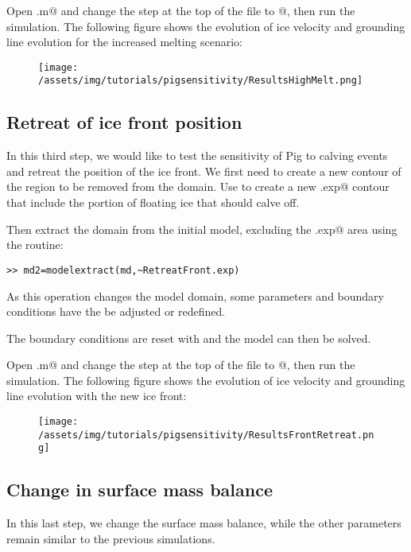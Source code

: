 Open \verb@runme.m@ and change the step at the top of the file to @, then run the simulation. The following figure shows the evolution of ice velocity and grounding line evolution for the increased melting scenario:
\begin{figure}[H]
	\begin{center}
		\texttt{[image: /assets/img/tutorials/pigsensitivity/ResultsHighMelt.png]}
	\end{center}
\end{figure}
\subsection{Retreat of ice front position}%
In this third step, we would like to test the sensitivity of Pig to calving events and retreat the position of the ice front. We first need to create a new contour of the region to be removed from the domain. Use \verb@exptool@ to create a new \verb@RetreatFront.exp@ contour that include the portion of floating ice that should calve off.

Then extract the domain from the initial model, excluding the \verb@RetreatFront.exp@ area using the \verb@extrude@ routine:
\begin{verbatim}>> md2=modelextract(md,~RetreatFront.exp)\end{verbatim}

As this operation changes the model domain, some parameters and boundary conditions have the be adjusted or redefined.

The boundary conditions are reset with \verb@SetMarineIceSheetBC@ and the model can then be solved.

Open \verb@runme.m@ and change the step at the top of the file to @, then run the simulation. The following figure shows the evolution of ice velocity and grounding line evolution with the new ice front:
\begin{figure}[H]
	\begin{center}
		\texttt{[image: /assets/img/tutorials/pigsensitivity/ResultsFrontRetreat.png]}
	\end{center}
\end{figure}
\subsection{Change in surface mass balance}%
In this last step, we change the surface mass balance, while the other parameters remain similar to the previous simulations.

